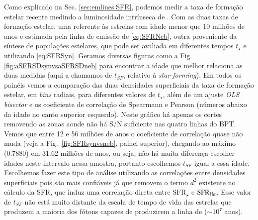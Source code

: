 Como explicado na Sec. \ref{sec:emlines:SFR}, podemos medir a taxa de formação estelar recente
medindo a luminosidade intrínseca de \Halpha. Com as duas taxas de formação estelar, uma referente
às estrelas com idade menor que 10 milhões de anos e estimada pela linha de emissão de \Halpha
\eqref{eq:SFRNeb}, outra proveniente da síntese de populações estelares, que pode ser avaliada em
diferentes tempos $t_\star$ e utilizando \eqref{eq:SFRSyn}. Geramos diversas figuras como a Fig.
\ref{fig:aSFRSDsynvsaSFRSDneb} para encontrar a idade que melhor relaciona as duas medidas (aqui a
chamamos de $t_{SF}$, relativo à {\em star-forming}). Em todos os painéis vemos a comparação das
duas densidades superficiais da taxa de formação estelar, em {\em bins} radiais, para diferentes
valores de $t_\star$, além de um ajuste {\em OLS bisector} e os coeficiente de correlação de
Spearmann e Pearson (números abaixo da idade no canto superior esquerdo). Neste gráfico há apenas os
cortes removendo as zonas aonde não há S/N suficiente nas quatro linhas do BPT. Vemos que entre 12 e
56 milhões de anos o coeficiente de correlação quase não muda (veja a Fig.\ \ref{fig:SFRsynvsneb},
painel superior), chegando ao máximo (0.7880) em 31.62 milhões de anos, ou seja, não há muita
diferença escolher idades neste intervalo nessa amostra, portanto escolhemos $t_{SF}$ igual a essa
idade. Escolhemos fazer este tipo de análise utilizando as correlações entre densidades superficiais
pois são mais confiáveis já que removem o termo $d^2$ existente no cálculo da SFR, que induz uma
correlação direta entre $\mathrm{SFR}_\star$ e $\mathrm{SFR}_{\Halpha}$. Esse valor de $t_{SF}$ não
está muito distante da escala de tempo de vida das estrelas que produzem a maioria dos fótons
capazes de produzirem a linha de \Halpha ($\sim10^7$ anos).

